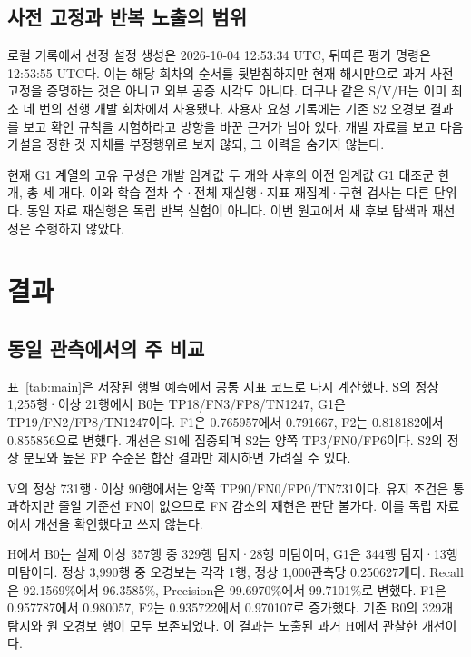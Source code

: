 \documentclass{article}
\begin{document}
\subsection{사전 고정과 반복 노출의 범위}
로컬 기록에서 선정 설정 생성은 2026-10-04 12:53:34 UTC, 뒤따른 평가 명령은 12:53:55 UTC다. 이는 해당 회차의 순서를 뒷받침하지만 현재 해시만으로 과거 사전 고정을 증명하는 것은 아니고 외부 공증 시각도 아니다. 더구나 같은 S/V/H는 이미 최소 네 번의 선행 개발 회차에서 사용됐다. 사용자 요청 기록에는 기존 S2 오경보 결과를 보고 확인 규칙을 시험하라고 방향을 바꾼 근거가 남아 있다. 개발 자료를 보고 다음 가설을 정한 것 자체를 부정행위로 보지 않되, 그 이력을 숨기지 않는다.

현재 G1 계열의 고유 구성은 개발 임계값 두 개와 사후의 이전 임계값 G1 대조군 한 개, 총 세 개다. 이와 학습 절차 수·전체 재실행·지표 재집계·구현 검사는 다른 단위다. 동일 자료 재실행은 독립 반복 실험이 아니다. 이번 원고에서 새 후보 탐색과 재선정은 수행하지 않았다.

\section{결과}
\subsection{동일 관측에서의 주 비교}
표~\ref{tab:main}은 저장된 행별 예측에서 공통 지표 코드로 다시 계산했다. S의 정상 1,255행·이상 21행에서 B0는 TP18/FN3/FP8/TN1247, G1은 TP19/FN2/FP8/TN1247이다. F1은 0.765957에서 0.791667, F2는 0.818182에서 0.855856으로 변했다. 개선은 S1에 집중되며 S2는 양쪽 TP3/FN0/FP6이다. S2의 정상 분모와 높은 FP 수준은 합산 결과만 제시하면 가려질 수 있다.

V의 정상 731행·이상 90행에서는 양쪽 TP90/FN0/FP0/TN731이다. 유지 조건은 통과하지만 줄일 기준선 FN이 없으므로 FN 감소의 재현은 판단 불가다. 이를 독립 자료에서 개선을 확인했다고 쓰지 않는다.

H에서 B0는 실제 이상 357행 중 329행 탐지·28행 미탐이며, G1은 344행 탐지·13행 미탐이다. 정상 3,990행 중 오경보는 각각 1행, 정상 1,000관측당 0.250627개다. Recall은 92.1569\%에서 96.3585\%, Precision은 99.6970\%에서 99.7101\%로 변했다. F1은 0.957787에서 0.980057, F2는 0.935722에서 0.970107로 증가했다. 기존 B0의 329개 탐지와 원 오경보 행이 모두 보존되었다. 이 결과는 노출된 과거 H에서 관찰한 개선이다.

\begin{table}[t]\centering\small\caption{B0와 G1의 같은 원행 비교. 수는 관측 행이며 독립 고장 수가 아니다. FPR만 백분율이고 나머지 비율은 0--1이다. S는 S1/S2와 중첩한다.}\label{tab:main}\end{table}
\end{document}
